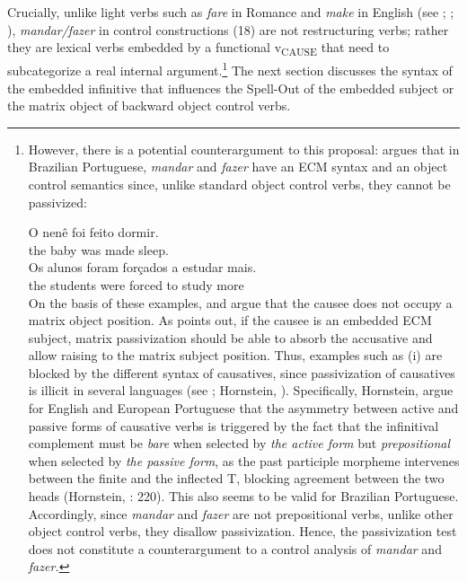 \documentclass[output=paper]{langsci/langscibook}
\begin{document}
Crucially, unlike light verbs such as \textit{fare} in Romance and \textit{make} in English (see \citealt{Guasti1996}; \citealt{Folli2007}; \citealt{Pylkkänen2002,Pylkkänen2008}), \textit{mandar\slash fazer} in control constructions (18) are not restructuring verbs; rather they are lexical verbs embedded by a functional v\textsubscript{CAUSE}  that need to subcategorize a real internal argument.\footnote{However, there is a potential counterargument to this proposal: \citet{Farrell1995} argues that in Brazilian Portuguese, \textit{mandar} and \textit{fazer} have an ECM syntax and an object control semantics since, unlike standard object control verbs, they cannot be passivized:

\ea\gll * O nenê   foi feito    dormir.\\
          {}  the baby  was made  sleep.\\
\z
\ea\gll {} Os alunos  foram forçados  a  estudar  mais.\\
         {}  the students were  forced to study  more\\
\z
On the basis of these examples, \citet{Farrell1995} and \citet{Hornstein2003} argue that the causee does not occupy a matrix object position. As \citet{Landau2004} points out, if the causee is an embedded ECM subject, matrix passivization should be able to absorb the accusative and allow raising to the matrix subject position.   Thus, examples such as (i) are blocked by the different syntax of causatives, since passivization of causatives is illicit in several languages (see \citealt{Landau2004}; Hornstein, \citet{Martins2008}). Specifically, Hornstein, \citet{Martins2008} argue for English and European Portuguese that the asymmetry between active and passive forms of causative verbs is triggered by the fact that the infinitival complement must be \textit{bare} when selected by \textit{the active form} but \textit{prepositional} when selected by \textit{the passive form}, as the past participle morpheme intervenes between the finite and the inflected T, blocking agreement between the two heads (Hornstein, \citet{Martins2008}: 220).  This also seems to be valid for Brazilian Portuguese. Accordingly, since \textit{mandar} and \textit{fazer} are not prepositional verbs, unlike other object control verbs, they disallow passivization. Hence, the passivization test does not constitute a counterargument to a control analysis of \textit{mandar} and \textit{fazer.}} The next section discusses the syntax of the embedded infinitive that influences the Spell-Out of the embedded subject or the matrix object of backward object control verbs. 
\end{document}
